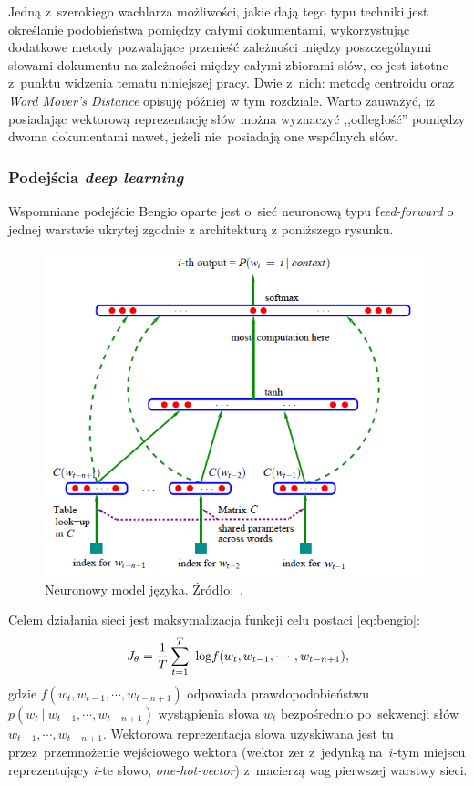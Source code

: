 \documentclass[pl]{minipw} %
\begin{document}
Jedną z~szerokiego wachlarza możliwości, jakie dają tego typu techniki jest określanie podobieństwa pomiędzy całymi dokumentami, wykorzystując dodatkowe metody pozwalające przenieść zależności między poszczególnymi słowami dokumentu na zależności między całymi zbiorami słów, co jest istotne z~punktu widzenia tematu niniejszej pracy. Dwie z~nich: metodę centroidu oraz \textit{Word Mover's Distance} opisuję później w tym rozdziale. Warto zauważyć, iż posiadając wektorową reprezentację słów można wyznaczyć ,,odległość'' pomiędzy dwoma dokumentami nawet, jeżeli nie~posiadają one wspólnych słów.


\subsubsection{Podejścia \textit{deep learning}}

Wspomniane podejście Bengio oparte jest o~sieć neuronową typu f\textit{eed-forward} o jednej warstwie ukrytej zgodnie z architekturą z poniższego rysunku.

\begin{figure}[H]
	\centering
	\includegraphics[width=1\textwidth]{img/bengio_language_model.png}
	\caption{Neuronowy model języka. Źródło:~\cite{bengio}.}
\end{figure}

Celem działania sieci jest maksymalizacja funkcji celu postaci \ref{eq:bengio}:
\begin{equation}
\label{eq:bengio}
J_\theta = \frac{1}{T}\sum\limits_{t=1}^T\ \text{log} \space f(w_t , w_{t-1} , \cdots , w_{t-n+1}),
\end{equation}
gdzie $f(w_t , w_{t-1} , \cdots , w_{t-n+1})$ odpowiada prawdopodobieństwu $p(w_t \: | \: w_{t-1} , \cdots , w_{t-n+1})$ wystąpienia słowa $w_t$ bezpośrednio po~sekwencji słów $w_{t-1} , \cdots , w_{t-n+1}$. Wektorowa reprezentacja słowa uzyskiwana jest tu przez~przemnożenie wejściowego wektora (wektor zer z~jedynką na~$i$-tym miejscu reprezentujący $i$-te słowo, \textit{one-hot-vector}) z~macierzą wag pierwszej warstwy sieci.
\end{document}

